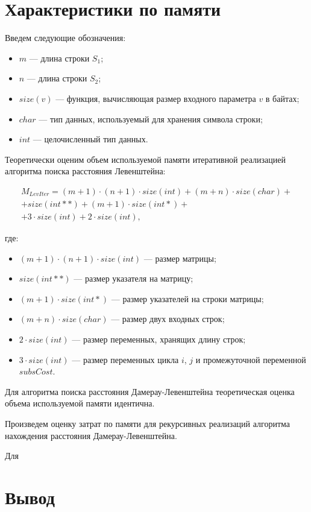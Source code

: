 \section{Характеристики по памяти}

Введем следующие обозначения:

\begin{itemize}
    \item $m$ --- длина строки $S_1$;
    \item $n$ --- длина строки $S_2$;
    \item $size(v)$ --- функция, вычисляющая размер входного параметра $v$ в байтах;
    \item $char$ --- тип данных, используемый для хранения символа строки;
    \item $int$ --- целочисленный тип данных.
\end{itemize}


Теоретически оценим объем используемой памяти итеративной реализацией алгоритма поиска расстояния Левенштейна:

\begin{equation}
    \begin{split}
        M_{LevIter} = (m + 1) \cdot (n + 1) \cdot size(int) + (m + n) \cdot size(char) + \\
        + size(int**) + (m + 1) \cdot size(int*) + \\
        + 3 \cdot size(int) + 2 \cdot size(int),
    \end{split}
\end{equation}

\noindent где:
\begin{itemize}
    \item $(m + 1) \cdot (n + 1) \cdot size(int)$ --- размер матрицы;
    \item $size(int**)$ --- размер указателя на матрицу;
    \item $(m + 1) \cdot size(int*)$ --- размер указателей на строки матрицы;
    \item $(m + n) \cdot size(char)$ --- размер двух входных строк;
    \item $2 \cdot size(int)$ --- размер переменных, хранящих длину строк;
    \item $3 \cdot size(int)$ --- размер переменных цикла $i$, $j$ и промежуточной переменной $subsCost$.
\end{itemize}

Для алгоритма поиска расстояния Дамерау-Левенштейна теорети\-ческая оценка объема используемой памяти идентична.

Произведем оценку затрат по памяти для рекурсивных реализаций алгоритма нахождения расстояния Дамерау-Левенштейна.

Для 

\section{Вывод}
